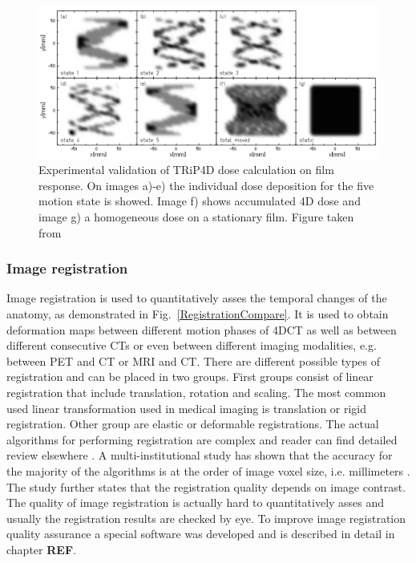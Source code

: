 \documentclass[type=dr, dr=rernat, accentcolor=tud7b,colorbacktitle, bigchapter, openright, twoside, 12pt ]{tudthesis}
\begin{document}
\begin{figure}[H]
\begin{center}
\includegraphics[scale=0.35]{./Images/4DtreatmentPlanning.png}
\caption{Experimental validation of TRiP4D dose calculation on film response. On images a)-e) the individual dose deposition for the five motion state is showed.
Image f) shows accumulated 4D dose and image g) a homogeneous dose on a stationary film. Figure taken from \cite{Richter2012}}
\label{TRiP4Ddose}
\end{center}
\end{figure}

\subsubsection{Image registration}
\label{sec:registration}

Image registration is used to quantitatively asses the temporal changes of the anatomy, as demonstrated in Fig.~\ref{RegistrationCompare}. It is used to obtain deformation maps between different motion phases of 4DCT
as well as between different consecutive CTs or even between different imaging modalities, e.g. between PET and CT or MRI and CT. There are different possible types of
registration and can be placed in two groups. First groups consist of linear registration that include translation, rotation and scaling. The most common used linear transformation used
in medical imaging is translation or rigid registration. Other group are elastic or deformable registrations. The actual algorithms for performing registration are complex and reader can
find detailed review elsewhere \cite{Hill2001,Brock2006,Rietzel2006a}. A multi-institutional study has shown that the accuracy for the majority of the algorithms is at the order of image voxel
size, i.e. millimeters \cite{Brock2010}. The study further states that the registration quality depends on image contrast. The quality of image registration is actually hard to quantitatively
asses and usually the registration results are checked by eye. To improve image registration quality assurance a special software was developed and is described in detail in chapter \textbf{REF}.
\end{document}
